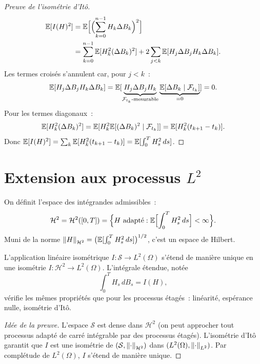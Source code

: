 \begin{proof}[Preuve de l'isom\'etrie d'It\^o]
\begin{align*}
  \mathbb{E}[I(H)^2] &= \mathbb{E}\Bigl[\Bigl(\sum_{k=0}^{n-1} H_k \Delta B_k\Bigr)^2\Bigr] \\
  &= \sum_{k=0}^{n-1} \mathbb{E}[H_k^2 (\Delta B_k)^2]
    + 2 \sum_{j < k} \mathbb{E}[H_j \Delta B_j H_k \Delta B_k].
\end{align*}
Les termes crois\'es s'annulent car, pour $j < k$~:
\[
  \mathbb{E}[H_j \Delta B_j H_k \Delta B_k]
  = \mathbb{E}[\underbrace{H_j \Delta B_j H_k}_{\mathcal{F}_{t_k}\text{-mesurable}}
  \underbrace{\mathbb{E}[\Delta B_k \mid \mathcal{F}_{t_k}]}_{=0}] = 0.
\]
Pour les termes diagonaux~:
\[
  \mathbb{E}[H_k^2 (\Delta B_k)^2] = \mathbb{E}[H_k^2 \mathbb{E}[(\Delta B_k)^2 \mid \mathcal{F}_{t_k}]]
  = \mathbb{E}[H_k^2 (t_{k+1} - t_k)].
\]
Donc $\mathbb{E}[I(H)^2] = \sum_k \mathbb{E}[H_k^2 (t_{k+1} - t_k)] = \mathbb{E}[\int_0^T H_s^2 \, ds]$.
\end{proof}

\section{Extension aux processus $L^2$}

\begin{definition}
On d\'efinit l'espace des int\'egrandes admissibles~:
\[
  \mathcal{H}^2 = \mathcal{H}^2([0, T]) = \Bigl\{H \text{ adapt\'e}
  : \mathbb{E}\Bigl[\int_0^T H_s^2 \, ds\Bigr] < \infty \Bigr\}.
\]
Muni de la norme $\left\| H \right\|_{\mathcal{H}^2} = \bigl(\mathbb{E}[\int_0^T H_s^2 \, ds]\bigr)^{1/2}$,
c'est un espace de Hilbert.
\end{definition}

\begin{theoreme}
\label{thm:extension_ito}
L'application lin\'eaire isom\'etrique $I : \mathcal{S} \to L^2(\Omega)$ s'\'etend
de mani\`ere unique en une isom\'etrie $I : \mathcal{H}^2 \to L^2(\Omega)$.
L'int\'egrale \'etendue, not\'ee
\[
  \int_0^T H_s \, dB_s = I(H),
\]
v\'erifie les m\^emes propri\'et\'es que pour les processus \'etag\'es~: lin\'earit\'e,
esp\'erance nulle, isom\'etrie d'It\^o.
\end{theoreme}

\begin{proof}[Id\'ee de la preuve]
L'espace $\mathcal{S}$ est dense dans $\mathcal{H}^2$ (on peut approcher tout
processus adapt\'e de carr\'e int\'egrable par des processus \'etag\'es). L'isom\'etrie
d'It\^o garantit que $I$ est une isom\'etrie de $(\mathcal{S}, \left\| \cdot \right\|_{\mathcal{H}^2})$
dans $(L^2(\Omega), \left\| \cdot \right\|_{L^2})$. Par compl\'etude de $L^2(\Omega)$,
$I$ s'\'etend de mani\`ere unique.
\end{proof}

